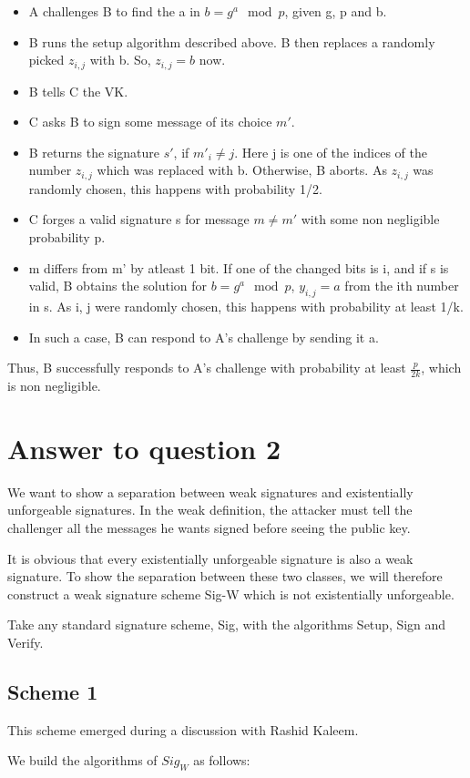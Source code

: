\documentclass[10pt]{article}
\begin{document}
\begin{itemize}
 \item A challenges B to find the a in $b = g^{a} \mod p$, given g, p and b.
 \item B runs the setup algorithm described above. B then replaces a randomly picked $z_{i, j}$ with b. So, $z_{i, j} = b$ now.
 \item B tells C the VK.
 \item C asks B to sign some message of its choice $m'$.
 \item B returns the signature $s'$, if $m'_{i} \neq j$. Here j is one of the indices of the number $z_{i,j}$ which was replaced with b. Otherwise, B aborts. As $z_{i,j}$ was randomly chosen, this happens with probability 1/2.
 \item C forges a valid signature s for message $m\neq m'$ with some non negligible probability p.
 \item m differs from m' by atleast 1 bit. If one of the changed bits is i, and if s is valid, B obtains the solution for $b = g^{a} \mod p$, $y_{i, j} = a$ from the ith number in s. As i, j were randomly chosen, this happens with probability at least 1/k.
 \item In such a case, B can respond to A's challenge by sending it a.
\end{itemize}

Thus, B successfully responds to A's challenge with probability at least $\frac{p}{2k}$, which is non negligible.

\section{Answer to question 2}
We want to show a separation between weak signatures and existentially unforgeable signatures. In the weak definition, the attacker must tell the challenger all the messages he wants signed before seeing the public key.

It is obvious that every existentially unforgeable signature is also a weak signature. To show the separation between these two classes, we will therefore construct a weak signature scheme Sig-W which is not existentially unforgeable.

Take any standard signature scheme, Sig, with the algorithms Setup, Sign and Verify.


\subsection*{Scheme 1}
\begin{ack}
 This scheme emerged during a discussion with Rashid Kaleem.
\end{ack}
We build the algorithms of $Sig_{W}$ as follows:
\end{document}

